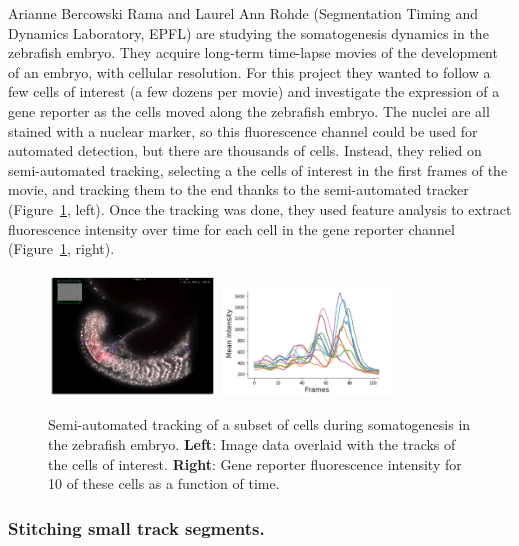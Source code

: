 Arianne Bercowski Rama and Laurel Ann Rohde (Segmentation Timing and Dynamics Laboratory, EPFL) are studying the somatogenesis dynamics in the zebrafish embryo.
They acquire long-term time-lapse movies of the development of an embryo, with cellular resolution.
For this project they wanted to follow a few cells of interest (a few dozens per movie) and investigate the expression of a gene reporter as the cells moved along the zebrafish embryo.
The nuclei are all stained with a nuclear marker, so this fluorescence channel could be used for automated detection, but there are thousands of cells.
Instead, they relied on semi-automated tracking, selecting a the cells of interest in the first frames of the movie, and tracking them to the end thanks to the semi-automated tracker (Figure~\ref{fig:ArianneUseCase}, left). 
Once the tracking was done, they used feature analysis to extract fluorescence intensity over time for each cell in the gene reporter channel (Figure~\ref{fig:ArianneUseCase}, right).


\begin{figure}
    \centering
    \null\hfill
    \includegraphics[width=0.4\textwidth]{figures/Mastodon_ArianneUseCase_01.png}
    \hfill
    \includegraphics[width=0.4\textwidth]{figures/Mastodon_ArianneUseCase_02.png}
    \hfill\null
    \caption{Semi-automated tracking of a subset of cells during somatogenesis in the zebrafish embryo. \textbf{Left}: Image data overlaid with the tracks of the cells of interest. \textbf{Right}: Gene reporter fluorescence intensity for 10 of these cells as a function of time.}
    \label{fig:ArianneUseCase}
\end{figure}


\subsubsection{Stitching small track segments.}


